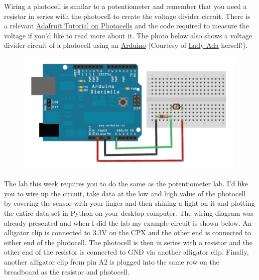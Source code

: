 Wiring a photocell is similar to a potentiometer and remember that you need a resistor in series with the photocell to create the voltage divider circuit. There is a relevant \href{https://learn.adafruit.com/photocells/circuitpython}{Adafruit Tutorial on Photocells} and the code required to measure the voltage if you’d like to read more about it. The photo below also shows a voltage divider circuit of a photocell using an \href{https://learn.adafruit.com/photocells/arduino-code}{Arduino} (Courtesy of \href{https://learn.adafruit.com/u/adafruit2}{Lady Ada} herself!).
\begin{figure}[H]
  \begin{center}
    \includegraphics[width=\textwidth]{Figures/arduino_photocell.png}
  \end{center}
\end{figure}
The lab this week requires you to do the same as the potentiometer lab. I’d like you to wire up the circuit, take data at the low and high value of the photocell by covering the sensor with your finger and then shining a light on it and plotting the entire data set in Python on your desktop computer. The wiring diagram was already presented and when I did the lab my example circuit is shown below. An alligator clip is connected to 3.3V on the CPX and the other end is connected to either end of the photocell. The photocell is then in series with a resistor and the other end of the resistor is connected to GND via another alligator clip. Finally, another alligator clip from pin A2 is plugged into the same row on the breadboard as the resistor and photocell. 
